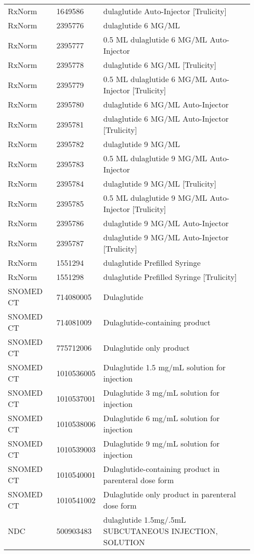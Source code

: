 \begin{longtable}{p{}p{}p{}}
  RxNorm & 1649586 & dulaglutide Auto-Injector [Trulicity] \\ 
  RxNorm & 2395776 & dulaglutide 6 MG/ML \\ 
  RxNorm & 2395777 & 0.5 ML dulaglutide 6 MG/ML Auto-Injector \\ 
  RxNorm & 2395778 & dulaglutide 6 MG/ML [Trulicity] \\ 
  RxNorm & 2395779 & 0.5 ML dulaglutide 6 MG/ML Auto-Injector [Trulicity] \\ 
  RxNorm & 2395780 & dulaglutide 6 MG/ML Auto-Injector \\ 
  RxNorm & 2395781 & dulaglutide 6 MG/ML Auto-Injector [Trulicity] \\ 
  RxNorm & 2395782 & dulaglutide 9 MG/ML \\ 
  RxNorm & 2395783 & 0.5 ML dulaglutide 9 MG/ML Auto-Injector \\ 
  RxNorm & 2395784 & dulaglutide 9 MG/ML [Trulicity] \\ 
  RxNorm & 2395785 & 0.5 ML dulaglutide 9 MG/ML Auto-Injector [Trulicity] \\ 
  RxNorm & 2395786 & dulaglutide 9 MG/ML Auto-Injector \\ 
  RxNorm & 2395787 & dulaglutide 9 MG/ML Auto-Injector [Trulicity] \\ 
  RxNorm & 1551294 & dulaglutide Prefilled Syringe \\ 
  RxNorm & 1551298 & dulaglutide Prefilled Syringe [Trulicity] \\ 
  SNOMED CT & 714080005 & Dulaglutide \\ 
  SNOMED CT & 714081009 & Dulaglutide-containing product \\ 
  SNOMED CT & 775712006 & Dulaglutide only product \\ 
  SNOMED CT & 1010536005 & Dulaglutide 1.5 mg/mL solution for injection \\ 
  SNOMED CT & 1010537001 & Dulaglutide 3 mg/mL solution for injection \\ 
  SNOMED CT & 1010538006 & Dulaglutide 6 mg/mL solution for injection \\ 
  SNOMED CT & 1010539003 & Dulaglutide 9 mg/mL solution for injection \\ 
  SNOMED CT & 1010540001 & Dulaglutide-containing product in parenteral dose form \\ 
  SNOMED CT & 1010541002 & Dulaglutide only product in parenteral dose form \\ 
  NDC & 500903483 & dulaglutide 1.5mg/.5mL SUBCUTANEOUS INJECTION, SOLUTION \\ 

\end{longtable}
